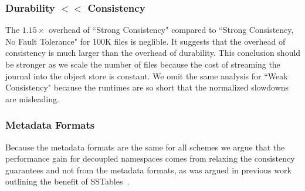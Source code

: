 \subsubsection{Durability \(<<\) Consistency} The \(1.15\times\) overhead of
``Strong Consistency" compared to ``Strong Consistency, No Fault Tolerance" for
100K files is neglible. It suggests that the overhead of consistency is much
larger than the overhead of durability. This conclusion should be stronger as
we scale the number of files because the cost of streaming the journal into the
object store is constant. We omit the same analysis for ``Weak Consistency"
because the runtimes are so short that the normalized slowdowns are misleading.

\subsubsection{Metadata Formats} Because the metadata formats are the same for
all schemes we argue that the performance gain for decoupled namespaces comes
from relaxing the consistency guarantees and not from the metadata formats, as
was argued in previous work outlining the benefit of
SSTables~\cite{ren:atc2013-tablefs, ren:sc2014-indexfs}.

